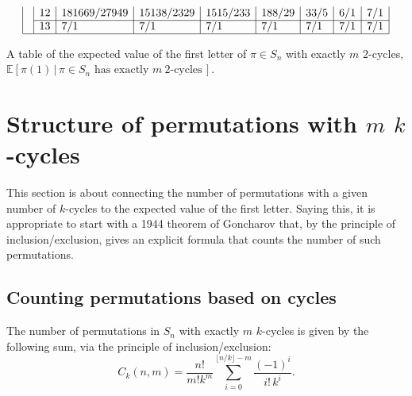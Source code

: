 \begin{table}
\begin{equation}
\begin{array}{|ll|l|l|l|l|l|l|l|l|l|l|}
  & \n{12} & 181669/27949 & 15138/2329 & 1515/233 & 188/29 & 33/5 & 6/1 & 7/1 \\ \cline{2-9}
  & \n{13} & 7/1          & 7/1        & 7/1      & 7/1    & 7/1  & 7/1 & 7/1 \\ \hline
  \end{array}
  \end{equation}
  \caption[The expected value of $\pi(1)$ for $\pi \in S_n$ with $m$ transpositions.]{
    A table of the expected value of the first letter of $\pi \in S_n$ with
    exactly $m$ $2$-cycles,
    ${\mathbb{E}[\pi(1)\, |\, \pi \in S_n \text{ has exactly } m\ 2 \text{-cycles}\,]}$.
  }
  \label{table:twoCycles}
\end{table}
\section{Structure of permutations with \texorpdfstring{$m$}{m} \texorpdfstring{$k$}{k}-cycles}
\label{section:recursiveStructure}
This section is about connecting the number of permutations with a given number of
$k$-cycles to the expected value of the first letter. Saying this, it is
appropriate to start with a 1944 theorem of Goncharov that, by the principle of
inclusion/exclusion, gives an explicit formula that counts the number of such
permutations.
\subsection{Counting permutations based on cycles}
\begin{theorem}
  \label{GoncharovTheorem}
  The number of permutations in $S_n$ with exactly $m$ $k$-cycles is given by
  the following sum, via the principle of inclusion/exclusion:
  \begin{equation}
    C_k(n,m)
    = \frac{n!}{m!k^m}\sum_{i=0}^{\lfloor n/k \rfloor - m} \frac{(-1)^i}{i!\,k^i}.
  \end{equation}
  \label{eq:Goncharov}
\end{theorem}

